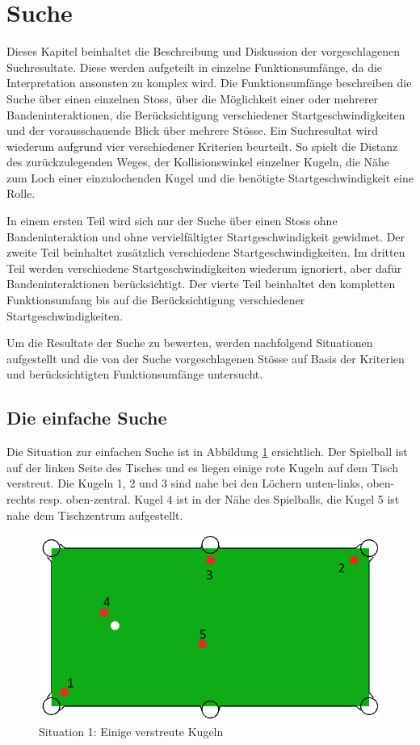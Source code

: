 \section{Suche}
Dieses Kapitel beinhaltet die Beschreibung und Diskussion der vorgeschlagenen Suchresultate. Diese werden aufgeteilt
in einzelne Funktionsumfänge, da die Interpretation ansonsten zu komplex wird. Die Funktionsumfänge beschreiben die Suche
über einen einzelnen Stoss, über die Möglichkeit einer oder mehrerer Bandeninteraktionen, die Berücksichtigung verschiedener
Startgeschwindigkeiten und der vorausschauende Blick über mehrere Stösse.
Ein Suchresultat wird wiederum aufgrund vier verschiedener
Kriterien beurteilt. So spielt die Distanz des zurückzulegenden Weges, der Kollisionswinkel einzelner Kugeln, die Nähe
zum Loch einer einzulochenden Kugel und die benötigte Startgeschwindigkeit eine Rolle.

In einem ersten Teil wird sich nur der Suche über einen Stoss ohne Bandeninteraktion und ohne
vervielfältigter Startgeschwindigkeit gewidmet. Der zweite Teil beinhaltet zusätzlich verschiedene Startgeschwindigkeiten.
Im dritten Teil werden verschiedene Startgeschwindigkeiten wiederum ignoriert, aber dafür Bandeninteraktionen berücksichtigt.
Der vierte Teil beinhaltet den kompletten Funktionsumfang bis auf die Berücksichtigung verschiedener Startgeschwindigkeiten.

Um die Resultate der Suche zu bewerten, werden nachfolgend Situationen aufgestellt und die von der Suche
vorgeschlagenen Stösse auf Basis der Kriterien und berücksichtigten Funktionsumfänge untersucht.

\subsection{Die einfache Suche}\label{kap:suche:die_einfache_suche}
Die Situation zur einfachen Suche ist in Abbildung \ref{fig:search_situation_1} ersichtlich.
Der Spielball ist auf der linken Seite des Tisches und es liegen einige rote Kugeln auf dem Tisch verstreut.
Die Kugeln 1, 2 und 3 sind nahe bei den Löchern unten-links, oben-rechts resp. oben-zentral.
Kugel 4 ist in der Nähe des Spielballs, die Kugel 5 ist nahe dem Tischzentrum aufgestellt.

%
%
\begin{figure}[h!]
    \begin{center}
        \includegraphics[width=0.4\linewidth]{../common/04_results/resources/simple_search/situation_diverse.PNG}
    \end{center}
    \caption{Situation 1: Einige verstreute Kugeln}
    \label{fig:search_situation_1}
\end{figure}

